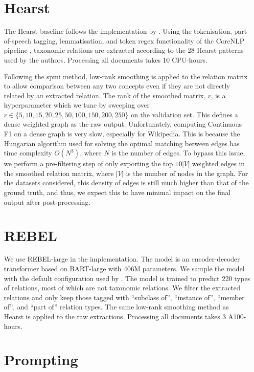 \section{Hearst}

The Hearst baseline follows the implementation by \citet{roller2018hearst}. Using the tokenisation, part-of-speech tagging, lemmatisation, and token regex functionality of the CoreNLP pipeline \cite{manning2014stanford}, taxonomic relations are extracted according to the 28 Hearst patterns used by the authors. Processing all documents takes 10 CPU-hours.

Following the spmi method, low-rank smoothing is applied to the relation matrix to allow comparison between any two concepts even if they are not directly related by an extracted relation. The rank of the smoothed matrix, $r$, is a hyperparameter which we tune by sweeping over $r \in \{5, 10, 15, 20, 25, 50, 100, 150, 200, 250\}$ on the validation set. This defines a dense weighted graph as the raw output. Unfortunately, computing Continuous F1 on a dense graph is very slow, especially for Wikipedia. This is because the Hungarian algorithm used for solving the optimal matching between edges has time complexity $O(N^3)$, where $N$ is the number of edges. To bypass this issue, we perform a pre-filtering step of only exporting the top $10|V|$ weighted edges in the smoothed relation matrix, where $|V|$ is the number of nodes in the graph. For the datasets considered, this density of edges is still much higher than that of the ground truth, and thus, we expect this to have minimal impact on the final output after post-processing.

\section{REBEL}

We use REBEL-large \cite{cabot2021rebel} in the implementation. The model is an encoder-decoder transformer based on BART-large \cite{lewis2019bart} with 406M parameters. We sample the model with the default configuration used by \citet{cabot2021rebel}. The model is trained to predict 220 types of relations, most of which are not taxonomic relations. We filter the extracted relations and only keep those tagged with ``subclass of'', ``instance of'', ``member of'', and ``part of'' relation types. The same low-rank smoothing method as Hearst is applied to the raw extractions. Processing all documents takes 3 A100-hours.

\section{Prompting}

